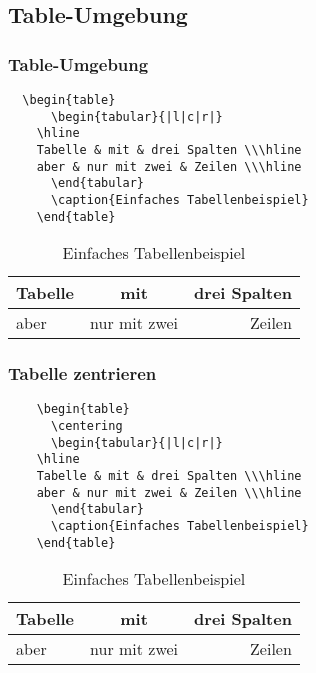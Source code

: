 \subsection{Table-Umgebung}
\begin{frame}[fragile]
\frametitle{Table-Umgebung}
  \begin{verbatim}  
  \begin{table}
      \begin{tabular}{|l|c|r|}
	\hline
	Tabelle & mit & drei Spalten \\\hline
	aber & nur mit zwei & Zeilen \\\hline
      \end{tabular}
      \caption{Einfaches Tabellenbeispiel}
    \end{table}
  \end{verbatim} \pause

  \begin{table}
      \begin{tabular}{|l|c|r|}
	\hline
	Tabelle & mit & drei Spalten \\\hline
	aber & nur mit zwei & Zeilen \\\hline
      \end{tabular}
      \caption{Einfaches Tabellenbeispiel}
    \end{table}
\end{frame}


\begin{frame}[fragile]
\frametitle{Tabelle zentrieren}
  \begin{verbatim}  
    \begin{table}
      \centering
      \begin{tabular}{|l|c|r|}
	\hline
	Tabelle & mit & drei Spalten \\\hline
	aber & nur mit zwei & Zeilen \\\hline
      \end{tabular}
      \caption{Einfaches Tabellenbeispiel}
    \end{table}
  \end{verbatim} \pause
    
    \begin{table}
      \centering
      \begin{tabular}{|l|c|r|}
	\hline
	Tabelle & mit & drei Spalten \\\hline
	aber & nur mit zwei & Zeilen \\\hline
      \end{tabular}
      \caption{Einfaches Tabellenbeispiel}
    \end{table}
\end{frame}
